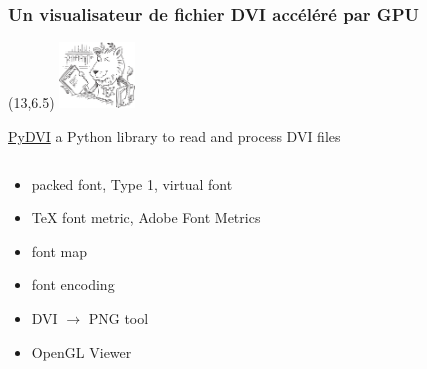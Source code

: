 
\begin{frame}
  \frametitle{Un visualisateur de fichier DVI accéléré par GPU}
  \begin{textblock}{2}(13,6.5)
    \includegraphics[width=2cm]{images/ctan-lion.pdf}
  \end{textblock}
  \begin{center}
    \href{https://github.com/FabriceSalvaire/PyDVI}{PyDVI} a Python library to read and process DVI files
  \end{center}
  \begin{columns}
    \begin{column}{.5\textwidth}
      \begin{itemize}
        \item packed font, Type 1, virtual font
        \item TeX font metric, Adobe Font Metrics
        \item font map
        \item font encoding
      \end{itemize}
      \vspace{1em}
      \begin{itemize}
      \item DVI $\longrightarrow$ PNG tool
      \item OpenGL Viewer
      \end{itemize}
    \end{column}
    \begin{column}{.5\textwidth}
      \begin{center}
\end{center}
\end{column}
\end{columns}
\end{frame}
